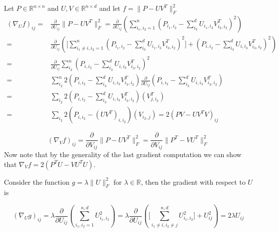 \documentclass{report}
\begin{document}
   Let $ P \in \mathbb{R}^{n \times n} $ and $ U, V \in \mathbb{R}^{n \times d} $ and let $ f = \|P - UV^T\|_F^2 $
   \begin{align*}
     (\nabla_U f)_{ij} =& \frac{\partial}{\partial U_{ij}}\|P - UV^T\|_F^2 = 
     \frac{\partial}{\partial U_{ij}} (\displaystyle \sum_{i_1,i_2 =1}^n(P_{i_1,i_2} 
                     - \displaystyle\sum_{i_3}^d U_{i_1,i_3}V^T_{i_3,i_2})^2)  \\
       =& \frac{\partial}{\partial U_{ij}} (\lbrack \displaystyle \sum_{i_1 \neq i,i_2 =1}^n(P_{i_1,i_2} 
       - \displaystyle\sum_{i_3}^d U_{i_1,i_3}V^T_{i_3,i_2})^2 \rbrack + (P_{i,i_2} 
       - \displaystyle\sum_{i_3}^d U_{i,i_3}V^T_{i_3,i_2})^2)\\
       =& \frac{\partial}{\partial U_{ij}}\displaystyle\sum_{i_2}^n(P_{i,i_2} 
       - \displaystyle\sum_{i_3}^d U_{i,i_3}V^T_{i_3,i_2})^2 \\
       =& \displaystyle\sum_{i_2}^n2(P_{i,i_2} 
       - \displaystyle\sum_{i_3}^d U_{i,i_3}V^T_{i_3,i_2})\frac{\partial}{\partial U_{ij}}(P_{i,i_2} 
       - \displaystyle\sum_{i_3}^d U_{i,i_3}V^T_{i_3,i_2}) \\
       =& \displaystyle\sum_{i_2} 2(P_{i,i_2} 
       - \displaystyle\sum_{i_3}^d U_{i,i_3}V^T_{i_3,i_2})(V^T_{j,i_2}) \\
       =& \displaystyle\sum_{i_2} 2(P_{i,i_2} 
       - (UV^T)_{i,i_2})(V_{i_2,j}) = 2(PV - UV^TV)_{ij}
   \end{align*}
 
  \[
    (\nabla_Vf)_{ij} 
    = \frac{\partial}{\partial V_{ij}}\|P - UV^T\|^2_F = \frac{\partial}{\partial V_{ij}}\|P^T - VU^T\|^2_F
  \]
   	Now note that by the generality of the last gradient computation we can show that $ \nabla_Vf = 2(P^TU - VU^TU) $.
   	
   	Consider the function $ g = \lambda\|U\|_F^2 $ for $ \lambda \in \mathbb{R} $, then the gradient with respect to $ U $ is 
   	
   	\[ 
   	 (\nabla_{U}g)_{ij} 
   	   = \lambda
   	     \frac{\partial}{\partial U_{ij}}(\sum_{i_1,i_2 = 1}^{n,d}U^2_{i_1,i_2})
   	   = \lambda \frac{\partial}{\partial U_{ij}}
   	     (\lbrack \sum_{i_1 \neq i,i_2 \neq j}^{n,d}U^2_{i_1,i_2}\rbrack + U_{ij}^2) = 2\lambda U_{ij}
   	\]
   	
\end{document}
